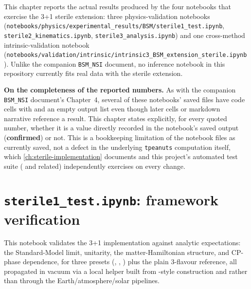 \label{ch:sterile-results}

This chapter reports the actual results produced by the four notebooks
that exercise the 3+1 sterile extension: three physics-validation notebooks
(\texttt{notebooks/physics/experimental\_results/BSM/sterile1\_test.ipynb},
\texttt{sterile2\_kinematics.ipynb}, \texttt{sterile3\_analysis.ipynb}) and
one cross-method intrinsic-validation notebook
(\texttt{notebooks/validation/intrinsic/intrinsic3\_BSM\_extension\_sterile.ipynb}).
Unlike the companion \texttt{BSM\_NSI} document, no inference notebook in
this repository currently fits real data with the sterile extension.

\begin{notebox}
\textbf{On the completeness of the reported numbers.} As with the
companion \texttt{BSM\_NSI} document's Chapter~4, several of these
notebooks' saved  files have code cells with
 and an empty output list even though later
cells or markdown narrative reference a result. This chapter states
explicitly, for every quoted number, whether it is a value directly
recorded in the notebook's saved output (\textbf{confirmed}) or not. This
is a bookkeeping limitation of the notebook files as currently saved, not a
defect in the underlying \texttt{tpeanuts} computation itself, which
\cref{ch:sterile-implementation} documents and this project's automated
test suite ( and related)
independently exercises on every change.
\end{notebox}

\section{\texttt{sterile1\_test.ipynb}: framework verification}
\label{sec:results-sterile1}

\begin{implbox}
This notebook validates the 3+1 implementation against analytic
expectations: the Standard-Model limit, unitarity, the matter-Hamiltonian
structure, and CP-phase dependence, for three presets
(, ,
) plus the plain 3-flavour
 reference, all propagated in vacuum via a local
helper built from -style construction and
 rather than through the Earth/atmosphere/solar
pipelines.
\end{implbox}

